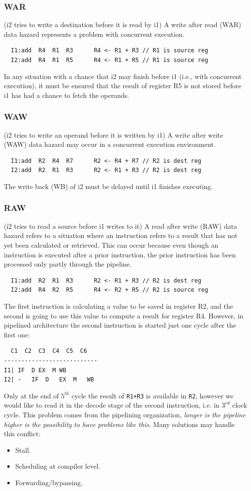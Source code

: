 \subsubsection{WAR}
(i2 tries to write a destination before it is read by i1) A write after read
(WAR) data hazard represents a problem with concurrent execution.
\begin{verbatim}
  I1:add  R4  R1  R3      R4 <- R1 + R3 // R1 is source reg
  I2:add  R4  R1  R5      R4 <- R1 + R5 // R1 is source reg
\end{verbatim}
In any situation with a chance that i2 may finish before i1 (i.e., with
concurrent execution), it must be ensured that the result of register R5 is not
stored before i1 has had a chance to fetch the operands.
\subsubsection{WAW}
(i2 tries to write an operand before it is written by i1) A
write after write (WAW) data hazard may occur in a concurrent execution
environment.
\begin{verbatim}
  I1:add  R2  R4  R7      R2 <- R4 + R7 // R2 is dest reg
  I2:add  R2  R1  R3      R2 <- R1 + R3 // R2 is dest reg
\end{verbatim}
The write back (WB) of i2 must be delayed until i1 finishes executing.
\subsubsection{RAW}
(i2 tries to read a source before i1 writes to it) A read after write (RAW) data
hazard refers to a situation where an instruction refers to a result that has
not yet been calculated or retrieved. This can occur because even though an
instruction is executed after a prior instruction, the prior instruction has
been processed only partly through the pipeline.
\begin{verbatim}
  I1:add  R2  R1  R3      R2 <- R1 + R3 // R2 is dest reg
  I2:add  R4  R2  R5      R4 <- R2 + R5 // R2 is source reg
\end{verbatim}
The first instruction is calculating a value to be saved in register R2, and the
second is going to use this value to compute a result for register R4. However,
in pipelined architecture the second instruction is started just one cycle after
the first one:
\begin{verbatim}
  C1  C2  C3  C4  C5  C6
---------------------------
I1| IF  D EX  M WB
I2| -   IF  D   EX  M   WB
\end{verbatim}
Only at the end of $5^{th}$ cycle the result of \verb|R1+R3| is available in
\verb|R2|, however we would like to read it in the decode stage of the second
instruction, i.e. in $3^{rd}$ clock cycle. This problem comes from the
pipelining organization, \textit{longer is the pipeline higher is the
possibility to have problems like this}. Many solutions may handle this
conflict:
\begin{itemize}
  \item Stall.
  \item Scheduling at compiler level.
  \item Forwarding/bypassing.
\end{itemize}
